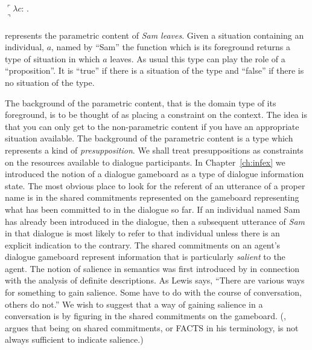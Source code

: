 \begin{ex}
\begin{subex}
\item $\ulcorner\lambda
  c$: . \\
\hspace*{2em}
$\urcorner$
 
 
\end{subex} 
\label{ex:paramcontSamLeft}   
\end{ex}

\preveg{} represents the parametric content of \textit{Sam leaves}.
Given a situation containing an individual, $a$, named by ``Sam'' the
function which is its foreground
returns a type of situation in which $a$ leaves.  As usual this type
can play the role of a ``proposition''.  It  is ``true''
if there is a situation of the type and ``false'' if there is no
situation of the type.

The background of the parametric content, that is the domain type
of its foreground,
is to be thought of as placing a constraint on the context.  The idea
is that you can only get to the non-parametric content if you have an
appropriate situation available.  The background of the parametric
content is a type which represents a kind of \textit{presupposition}.  We shall treat
presuppositions as constraints on the resources available to dialogue
participants.  In Chapter~\ref{ch:infex} we introduced the notion of a
dialogue gameboard as a type of dialogue information state.  The most
obvious place to look for the referent of an utterance of a proper
name is in the shared commitments represented on the gameboard
representing what has been committed to in the dialogue so far.  If an
individual named Sam has already been introduced in the dialogue, then
a subsequent utterance of \textit{Sam} in that dialogue is most likely
to refer to that individual unless there is an explicit indication to
the contrary.  The shared commitments on an agent's dialogue gameboard
represent information that is particularly \textit{salient} to the
agent.  The notion of salience in semantics was first introduced by
\cite{Lewis1979} in connection with the analysis of definite
descriptions.  As Lewis says, ``There are various ways for something
to gain salience. Some have to do with the course of conversation,
others do not.''  We wish to suggest that a way of gaining salience in
a conversation is by figuring in the shared commitments on the
gameboard.  (\citealp{Ginzburg2012}, argues that being on shared
commitments, or FACTS in his terminology, is not always sufficient to
indicate salience.)

